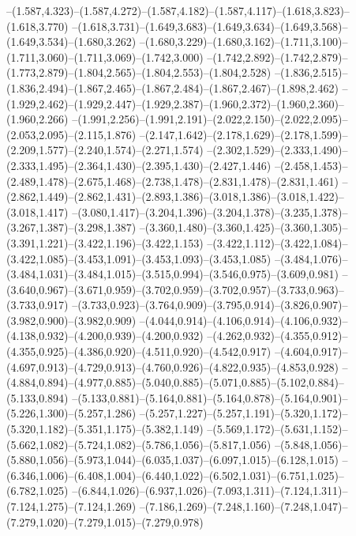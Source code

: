   --(1.587,4.323)--(1.587,4.272)--(1.587,4.182)--(1.587,4.117)--(1.618,3.823)--(1.618,3.770)%
  --(1.618,3.731)--(1.649,3.683)--(1.649,3.634)--(1.649,3.568)--(1.649,3.534)--(1.680,3.262)%
  --(1.680,3.229)--(1.680,3.162)--(1.711,3.100)--(1.711,3.060)--(1.711,3.069)--(1.742,3.000)%
  --(1.742,2.892)--(1.742,2.879)--(1.773,2.879)--(1.804,2.565)--(1.804,2.553)--(1.804,2.528)%
  --(1.836,2.515)--(1.836,2.494)--(1.867,2.465)--(1.867,2.484)--(1.867,2.467)--(1.898,2.462)%
  --(1.929,2.462)--(1.929,2.447)--(1.929,2.387)--(1.960,2.372)--(1.960,2.360)--(1.960,2.266)%
  --(1.991,2.256)--(1.991,2.191)--(2.022,2.150)--(2.022,2.095)--(2.053,2.095)--(2.115,1.876)%
  --(2.147,1.642)--(2.178,1.629)--(2.178,1.599)--(2.209,1.577)--(2.240,1.574)--(2.271,1.574)%
  --(2.302,1.529)--(2.333,1.490)--(2.333,1.495)--(2.364,1.430)--(2.395,1.430)--(2.427,1.446)%
  --(2.458,1.453)--(2.489,1.478)--(2.675,1.468)--(2.738,1.478)--(2.831,1.478)--(2.831,1.461)%
  --(2.862,1.449)--(2.862,1.431)--(2.893,1.386)--(3.018,1.386)--(3.018,1.422)--(3.018,1.417)%
  --(3.080,1.417)--(3.204,1.396)--(3.204,1.378)--(3.235,1.378)--(3.267,1.387)--(3.298,1.387)%
  --(3.360,1.480)--(3.360,1.425)--(3.360,1.305)--(3.391,1.221)--(3.422,1.196)--(3.422,1.153)%
  --(3.422,1.112)--(3.422,1.084)--(3.422,1.085)--(3.453,1.091)--(3.453,1.093)--(3.453,1.085)%
  --(3.484,1.076)--(3.484,1.031)--(3.484,1.015)--(3.515,0.994)--(3.546,0.975)--(3.609,0.981)%
  --(3.640,0.967)--(3.671,0.959)--(3.702,0.959)--(3.702,0.957)--(3.733,0.963)--(3.733,0.917)%
  --(3.733,0.923)--(3.764,0.909)--(3.795,0.914)--(3.826,0.907)--(3.982,0.900)--(3.982,0.909)%
  --(4.044,0.914)--(4.106,0.914)--(4.106,0.932)--(4.138,0.932)--(4.200,0.939)--(4.200,0.932)%
  --(4.262,0.932)--(4.355,0.912)--(4.355,0.925)--(4.386,0.920)--(4.511,0.920)--(4.542,0.917)%
  --(4.604,0.917)--(4.697,0.913)--(4.729,0.913)--(4.760,0.926)--(4.822,0.935)--(4.853,0.928)%
  --(4.884,0.894)--(4.977,0.885)--(5.040,0.885)--(5.071,0.885)--(5.102,0.884)--(5.133,0.894)%
  --(5.133,0.881)--(5.164,0.881)--(5.164,0.878)--(5.164,0.901)--(5.226,1.300)--(5.257,1.286)%
  --(5.257,1.227)--(5.257,1.191)--(5.320,1.172)--(5.320,1.182)--(5.351,1.175)--(5.382,1.149)%
  --(5.569,1.172)--(5.631,1.152)--(5.662,1.082)--(5.724,1.082)--(5.786,1.056)--(5.817,1.056)%
  --(5.848,1.056)--(5.880,1.056)--(5.973,1.044)--(6.035,1.037)--(6.097,1.015)--(6.128,1.015)%
  --(6.346,1.006)--(6.408,1.004)--(6.440,1.022)--(6.502,1.031)--(6.751,1.025)--(6.782,1.025)%
  --(6.844,1.026)--(6.937,1.026)--(7.093,1.311)--(7.124,1.311)--(7.124,1.275)--(7.124,1.269)%
  --(7.186,1.269)--(7.248,1.160)--(7.248,1.047)--(7.279,1.020)--(7.279,1.015)--(7.279,0.978)%
